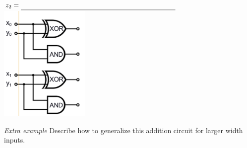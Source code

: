 
$z_2 = \underline{\phantom{(c_0 \land x_1) \oplus ((c_0 \oplus x_1)\land y_1)}\hspace{1.5in}}$\\

\includegraphics[width=1.7in]{../../resources/images/width-2-adder.png}
\vspace{100pt}

{\it Extra example} Describe how to generalize this addition circuit for larger width inputs.

